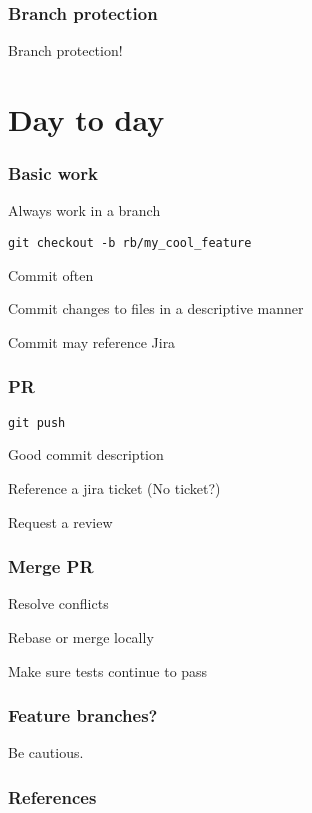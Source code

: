 \documentclass{beamer}
\begin{document}
\frame
{
   \frametitle{Branch protection}

   Branch protection!
}

\section{Day to day}

\frame
{
   \frametitle{Basic work}

Always work in a branch

\texttt{git checkout -b rb/my\_cool\_feature}

Commit often

Commit changes to files in a descriptive manner

Commit may reference Jira
}


\frame
{
   \frametitle{PR}

   \texttt{git push}

   Good commit description

   Reference a jira ticket (No ticket?)

   Request a review

}

\frame
{
   \frametitle{Merge PR}

    Resolve conflicts

    Rebase or merge locally

    Make sure tests continue to pass
}

\frame
{
   \frametitle{Feature branches?}

   Be cautious.
}



\begin{frame}[t,allowframebreaks]
\frametitle{References}
\printbibliography
\end{frame}
\end{document}
